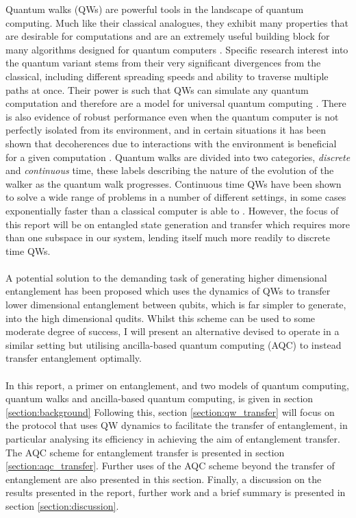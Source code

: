 Quantum walks (QWs) are powerful tools in the landscape of quantum computing. 
Much like their classical analogues, they exhibit many properties that are desirable for computations and are an extremely useful building block for many algorithms designed for quantum computers \cite{shenvi2003}. 
Specific research interest into the quantum variant stems from their very significant divergences from the classical, including different spreading speeds and ability to traverse multiple paths at once. 
Their power is such that QWs can simulate any quantum computation and therefore are a model for universal quantum computing \cite{Childs_2009}.
There is also evidence of robust performance even when the quantum computer is not perfectly isolated from its environment, and in certain situations it has been shown that decoherences due to interactions with the environment is beneficial for a given computation \cite{KENDON_2007}. 
Quantum walks are divided into two categories, \emph{discrete} and \emph{continuous} time, these labels describing the nature of the evolution of the walker as the quantum walk progresses.
Continuous time QWs have been shown to solve a wide range of problems in a number of different settings, in some cases exponentially faster than a classical computer is able to \cite{Childs_2003}. 
However, the focus of this report will be on entangled state generation and transfer which requires more than one subspace in our system, lending itself much more readily to discrete time QWs.\paragraph{}

A potential solution to the demanding task of generating higher dimensional entanglement has been proposed \cite{giordani2020} which uses the dynamics of QWs to transfer lower dimensional entanglement between qubits, which is far simpler to generate, into the high dimensional qudits. 
Whilst this scheme can be used to some moderate degree of success, I will present an alternative devised to operate in a similar setting but utilising ancilla-based quantum computing (AQC) to instead transfer entanglement optimally.\paragraph{}

In this report, a primer on entanglement, and two models of quantum computing, quantum walks and ancilla-based quantum computing, is given in section {\ref{section:background}}
Following this, section {\ref{section:qw_transfer}} will focus on the protocol that uses QW dynamics to facilitate the transfer of entanglement, in particular analysing its efficiency in achieving the aim of entanglement transfer. 
The AQC scheme for entanglement transfer is presented in section \ref{section:aqc_transfer}. 
Further uses of the AQC scheme beyond the transfer of entanglement are also presented in this section. 
Finally, a discussion on the results presented in the report, further work and a brief summary is presented in section {\ref{section:discussion}}.\newline

